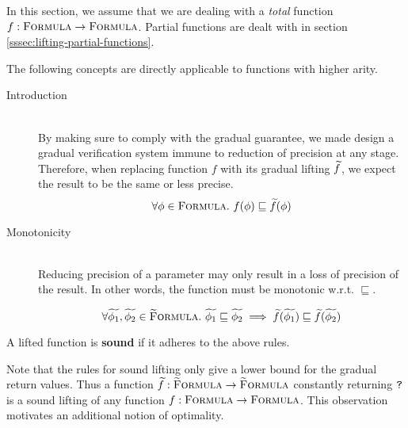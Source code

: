 
In this section, we assume that we are dealing with a \emph{total} function $f : \textup{\textsc{Formula}} \rightarrow \textup{\textsc{Formula}}$.
Partial functions are dealt with in section \ref{sssec:lifting-partial-functions}.

The following concepts are directly applicable to functions with higher arity.

\begin{description}
    \item[Introduction]~\\
    By making sure to comply with the gradual guarantee, we made design a gradual verification system immune to reduction of precision at any stage.
    Therefore, when replacing function $f$ with its gradual lifting $\widetilde{f}$, we expect the result to be the same or less precise.
    \begin{displaymath}
    \forall \phi \in \textup{\textsc{Formula}}.~ f(\phi) \sqsubseteq \widetilde{f}(\phi)
    \end{displaymath}
    
    \item[Monotonicity]~\\
    Reducing precision of a parameter may only result in a loss of precision of the result.
    In other words, the function must be monotonic w.r.t. $\sqsubseteq$.
    
    \begin{displaymath}
    \forall \widetilde{\phi_1}, \widetilde{\phi_2} \in \textup{\textsc{\ensuremath{\widetilde{\text{F}}}ormula}}.~ 
    \widetilde{\phi_1} \sqsubseteq \widetilde{\phi_2} 
    \implies 
    \widetilde{f}(\widetilde{\phi_1}) \sqsubseteq \widetilde{f}(\widetilde{\phi_2})
    \end{displaymath}
\end{description}

\begin{definition}
    A lifted function is \textbf{sound} if it adheres to the above rules.
\end{definition}

Note that the rules for sound lifting only give a lower bound for the gradual return values.
Thus a function $\widetilde{f} : \textup{\textsc{\ensuremath{\widetilde{\text{F}}}ormula}} \rightarrow \textup{\textsc{\ensuremath{\widetilde{\text{F}}}ormula}}$ constantly returning $\textup{\texttt{?}}$ is a sound lifting of any function $f : \textup{\textsc{Formula}} \rightarrow \textup{\textsc{Formula}}$.
This observation motivates an additional notion of optimality.

